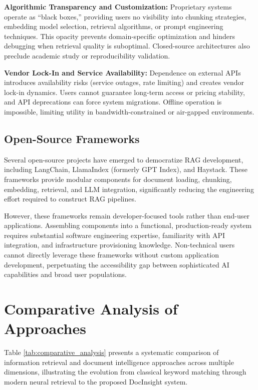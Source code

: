 \textbf{Algorithmic Transparency and Customization:} Proprietary systems operate as ``black boxes,'' providing users no visibility into chunking strategies, embedding model selection, retrieval algorithms, or prompt engineering techniques. This opacity prevents domain-specific optimization and hinders debugging when retrieval quality is suboptimal. Closed-source architectures also preclude academic study or reproducibility validation.

\textbf{Vendor Lock-In and Service Availability:} Dependence on external APIs introduces availability risks (service outages, rate limiting) and creates vendor lock-in dynamics. Users cannot guarantee long-term access or pricing stability, and API deprecations can force system migrations. Offline operation is impossible, limiting utility in bandwidth-constrained or air-gapped environments.

\subsection{Open-Source Frameworks}

Several open-source projects have emerged to democratize RAG development, including LangChain, LlamaIndex (formerly GPT Index), and Haystack. These frameworks provide modular components for document loading, chunking, embedding, retrieval, and LLM integration, significantly reducing the engineering effort required to construct RAG pipelines.

However, these frameworks remain developer-focused tools rather than end-user applications. Assembling components into a functional, production-ready system requires substantial software engineering expertise, familiarity with API integration, and infrastructure provisioning knowledge. Non-technical users cannot directly leverage these frameworks without custom application development, perpetuating the accessibility gap between sophisticated AI capabilities and broad user populations.

\section{Comparative Analysis of Approaches}

Table \ref{tab:comparative_analysis} presents a systematic comparison of information retrieval and document intelligence approaches across multiple dimensions, illustrating the evolution from classical keyword matching through modern neural retrieval to the proposed DocInsight system.

